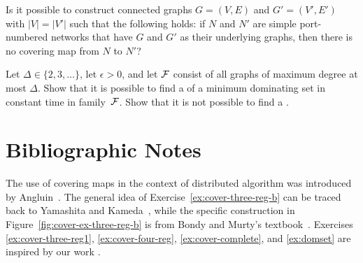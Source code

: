 \begin{ex}
    Is it possible to construct connected  graphs $G = (V,E)$ and $G' = (V'\!,E')$ with $|V| = |V'|$ such that the following holds: if $N$ and $N'$ are simple port-numbered networks that have $G$ and $G'$ as their underlying graphs, then there is no covering map from $N$ to $N'$?
\end{ex}

\begin{ex}\label{ex:domset}
    Let $\Delta \in \{2,3,\dotsc\}$, let $\epsilon > 0$, and let $\mathcal{F}$ consist of all graphs of maximum degree at most $\Delta$. Show that it is possible to find a  of a minimum dominating set in constant time in family~$\mathcal{F}$. Show that it is not possible to find a .
    
\end{ex}


\section{Bibliographic Notes}

The use of covering maps in the context of distributed algorithm was introduced by Angluin~\cite{angluin80local}. The general idea of Exercise~\ref{ex:cover-three-reg-b} can be traced back to Yamashita and Kameda~\cite{yamashita96computing}, while the specific construction in Figure~\ref{fig:cover-ex-three-reg-b} is from Bondy and Murty's textbook~\cite[Figure~5.10]{bondy76graph-theory}. Exercises \ref{ex:cover-three-reg1}, \ref{ex:cover-four-reg}, \ref{ex:cover-complete}, and \ref{ex:domset} are inspired by our work \cite{suomela10eds,astrand10weakly-coloured}.

